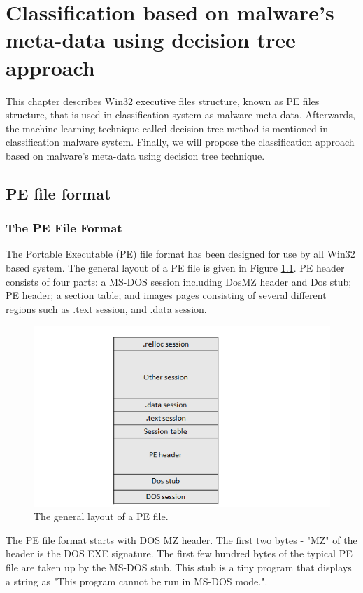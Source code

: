 \chapter{Classification based on malware's meta-data using decision tree approach}\label{chap:4}
%
%
This chapter describes Win32 executive files structure, known as PE files structure, that is used in classification system as malware meta-data. Afterwards, the machine learning technique called decision tree method is mentioned in classification malware system. Finally, we will propose the classification approach based on malware's meta-data using decision tree technique. 

\section{PE file format\cite{peheaderci}}
\subsection{The PE File Format}

The Portable Executable (PE) file format has been designed for use by all Win32 based system. The general layout of a PE file is given in Figure \ref{fig:pefiles}. PE header consists of four parts: a MS-DOS session including DosMZ header and Dos stub; PE header; a section table; and images pages consisting of several different regions such as .text session, and .data session.
\begin{figure}[h!]
\centering
\includegraphics[width=1\textwidth]{graph/pefiles.png}
\caption{The general layout of a PE file.}
\label{fig:pefiles}
\end{figure}

The PE file format starts with DOS MZ header. The first two bytes - "MZ" of the header is the DOS EXE signature. The first few hundred bytes of the typical PE file are taken up by the MS-DOS stub. This stub is a tiny program that displays a string as "This program cannot be run in MS-DOS mode.". 

